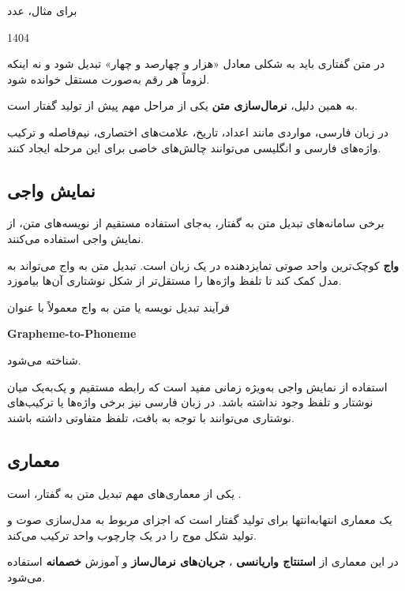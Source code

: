 برای مثال، عدد

\begin{center}
1404
\end{center}

در متن گفتاری باید به شکلی معادل «هزار و چهارصد و چهار» تبدیل
شود و نه اینکه لزوماً هر رقم به‌صورت مستقل خوانده شود.

به همین دلیل،
\textbf{نرمال‌سازی متن}
یکی از مراحل مهم پیش از تولید گفتار است.

در زبان فارسی، مواردی مانند اعداد، تاریخ، علامت‌های اختصاری،
نیم‌فاصله و ترکیب واژه‌های فارسی و انگلیسی می‌توانند چالش‌های
خاصی برای این مرحله ایجاد کنند.


\subsection{نمایش واجی}

برخی سامانه‌های تبدیل متن به گفتار، به‌جای استفاده مستقیم از
نویسه‌های متن، از نمایش واجی استفاده می‌کنند.

\textbf{واج}
کوچک‌ترین واحد صوتی تمایزدهنده در یک زبان است.
تبدیل متن به واج می‌تواند به مدل کمک کند تا تلفظ واژه‌ها را
مستقل‌تر از شکل نوشتاری آن‌ها بیاموزد.

فرآیند تبدیل نویسه یا متن به واج معمولاً با عنوان

\textbf{Grapheme-to-Phoneme}

شناخته می‌شود.

استفاده از نمایش واجی به‌ویژه زمانی مفید است که رابطه مستقیم
و یک‌به‌یک میان نوشتار و تلفظ وجود نداشته باشد.
در زبان فارسی نیز برخی واژه‌ها یا ترکیب‌های نوشتاری می‌توانند
با توجه به بافت، تلفظ متفاوتی داشته باشند.


\subsection{معماری }

یکی از معماری‌های مهم تبدیل متن به گفتار،
است \cite{kim2021vits}.

یک معماری انتهابه‌انتها برای تولید گفتار است که اجزای مربوط به
مدل‌سازی صوت و تولید شکل موج را در یک چارچوب واحد ترکیب می‌کند.

در این معماری از
\textbf{استنتاج واریانسی}
،
\textbf{جریان‌های نرمال‌ساز}
و آموزش
\textbf{خصمانه}
استفاده می‌شود.

